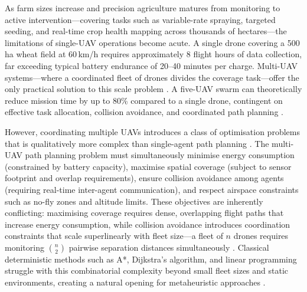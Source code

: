 \documentclass[review,3p,times]{elsarticle}
\begin{document}
As farm sizes increase and precision agriculture matures from monitoring to active intervention---covering tasks such as variable-rate spraying, targeted seeding, and real-time crop health mapping across thousands of hectares---the limitations of single-UAV operations become acute. A single drone covering a 500\,ha wheat field at 60\,km/h requires approximately 8 flight hours of data collection, far exceeding typical battery endurance of 20--40 minutes per charge. Multi-UAV systems---where a coordinated fleet of drones divides the coverage task---offer the only practical solution to this scale problem \cite{chung2018,gupta2016}. A five-UAV swarm can theoretically reduce mission time by up to 80\% compared to a single drone, contingent on effective task allocation, collision avoidance, and coordinated path planning \cite{chung2018}.

However, coordinating multiple UAVs introduces a class of optimisation problems that is qualitatively more complex than single-agent path planning \cite{chung2018,gupta2016,bekmezci2013,hayat2016}. The multi-UAV path planning problem must simultaneously minimise energy consumption (constrained by battery capacity), maximise spatial coverage (subject to sensor footprint and overlap requirements), ensure collision avoidance among agents (requiring real-time inter-agent communication), and respect airspace constraints such as no-fly zones and altitude limits. These objectives are inherently conflicting: maximising coverage requires dense, overlapping flight paths that increase energy consumption, while collision avoidance introduces coordination constraints that scale superlinearly with fleet size---a fleet of $n$ drones requires monitoring $\binom{n}{2}$ pairwise separation distances simultaneously \cite{bekmezci2013}. Classical deterministic methods such as A*, Dijkstra's algorithm, and linear programming struggle with this combinatorial complexity beyond small fleet sizes and static environments, creating a natural opening for metaheuristic approaches \cite{aitsaadi2022}.
\end{document}
